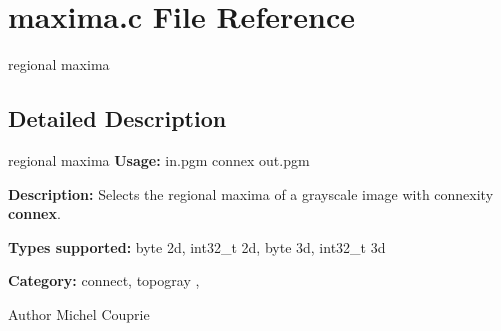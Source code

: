 \section{maxima.c File Reference}
\label{maxima_8c}


regional maxima  




\subsection{Detailed Description}
regional maxima {\bfseries Usage:} in.pgm connex out.pgm

{\bfseries Description:} Selects the regional maxima of a grayscale image with connexity {\bfseries connex}.

{\bfseries Types supported:} byte 2d, int32\_\-t 2d, byte 3d, int32\_\-t 3d

{\bfseries Category:} connect, topogray ,

\begin{DoxyAuthor}{Author}
Michel Couprie 
\end{DoxyAuthor}

